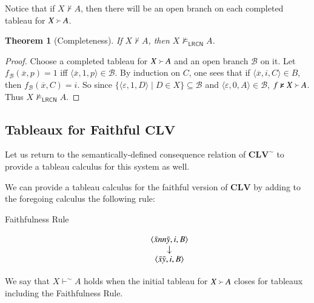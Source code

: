\documentclass{amsart}
\newtheorem{theorem}{Theorem}
\theoremstyle{definition}
\newcommand{\LRCN}{\mathsf{LRCN}}
\newcommand{\CLV}{\mathbf{CLV}}
\begin{document}
Notice that if $X\not\vdash A$, then there will be an open branch on each completed tableau for $X\Yright A$.

\begin{theorem}[Completeness]
    If $X\not\vdash A$, then $X\not\vDash_{\LRCN} A$.
\end{theorem}
\begin{proof}
    Choose a completed tableau for $X\Yright A$ and an open branch $\mathcal{B}$ on it. Let $f_{\mathcal{B}}(\overline{x},p)=1$ iff $\langle\overline{x},1,p\rangle\in \mathcal{B}$. By induction on $C$, one sees that if $\langle\overline{x},i,C\rangle\in B$, then $f_{\mathcal{B}}(\overline{x},C)=i$. So since $\{\langle\varepsilon,1,D\rangle\mid D\in X\}\subseteq \mathcal{B}$ and $\langle\varepsilon,0,A\rangle\in \mathcal{B}$, $f\not\vDash X\Yright A$. Thus $X\not\vDash_{\LRCN} A$.
\end{proof}

\subsection{Tableaux for Faithful $\CLV$}

Let us return to the semantically-defined consequence relation of $\mathbf{CLV}^{\sim}$ to provide a tableau calculus for this system as well.

We can provide a tableau calculus for the faithful version of $\CLV$ by adding to the foregoing calculus the following rule:

\vspace{.2cm}

\begin{center}
    \begin{description}

\item[Faithfulness Rule] 
    \begin{displaymath}
        \xymatrix@C=-10mm@R=3mm{\langle \bar{x}nn\bar{y},i,B\rangle\ar[d] \\
        \langle \bar{x}\bar{y},i,B\rangle}
    \end{displaymath}

            
    \end{description}
\end{center}

\vspace{.2cm}

We say that $X\vdash^{\sim}A$ holds when the initial tableau for $X\Yright A$ closes for tableaux including the Faithfulness Rule.
\end{document}
